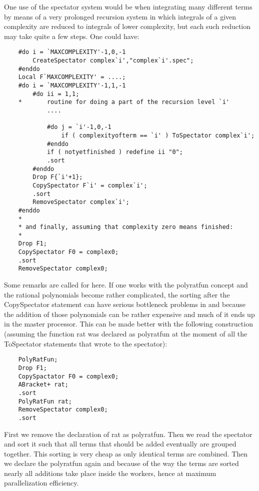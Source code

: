 One use of the spectator system would be when integrating many different 
terms by means of a very prolonged recursion system in which integrals of a 
given complexity are reduced to integrals of lower complexity, but each 
such reduction may take quite a few steps. One could have:
\begin{verbatim}
    #do i = `MAXCOMPLEXITY'-1,0,-1
        CreateSpectator complex`i',"complex`i'.spec";
    #enddo
    Local F`MAXCOMPLEXITY' = ....;
    #do i = `MAXCOMPLEXITY'-1,1,-1
        #do ii = 1,1;
    *       routine for doing a part of the recursion level `i'
            ....

            #do j = `i'-1,0,-1
                if ( complexityofterm == `i' ) ToSpectator complex`i';
            #enddo
            if ( notyetfinished ) redefine ii "0";
            .sort
        #enddo
        Drop F{`i'+1};
        CopySpectator F`i' = complex`i';
        .sort
        RemoveSpectator complex`i';
    #enddo
    *
    * and finally, assuming that complexity zero means finished:
    *
    Drop F1;
    CopySpectator F0 = complex0;
    .sort
    RemoveSpectator complex0;
\end{verbatim}
Some remarks are called for here. If one works with the 
polyratfun concept and the rational 
polynomials become rather complicated, the 
sorting after the CopySpectator statement can have serious bottleneck 
problems in \TFORM{} and \ParFORM{} because the 
addition of those polynomials can be rather expensive and much of it ends 
up in the master processor. This can be made better with the following 
construction (assuming the function rat was declared as polyratfun at the 
moment of all the ToSpectator statements that wrote to the spectator):
\begin{verbatim}
    PolyRatFun;
    Drop F1;
    CopySpactator F0 = complex0;
    ABracket+ rat;
    .sort
    PolyRatFun rat;
    RemoveSpectator complex0;
    .sort
\end{verbatim}
First we remove the declaration of rat as polyratfun. Then we read the 
spectator and sort it such that all terms that should be added eventually 
are grouped together. This sorting is very cheap as only identical terms 
are combined. Then we declare the polyratfun again and because of the way 
the terms are sorted nearly all additions take place inside the workers, 
hence at maximum parallelization efficiency.

